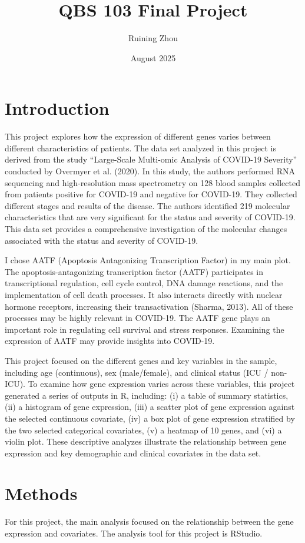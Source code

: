 \documentclass{article}
\title{QBS 103 Final Project}
\author{Ruining Zhou }
\date{August 2025}
\begin{document}
\maketitle

\section{Introduction}
This project explores how the expression of different genes varies between different characteristics of patients. The data set analyzed in this project is derived from the study “Large-Scale Multi-omic Analysis of COVID-19 Severity” conducted by Overmyer et al. (2020). In this study, the authors performed RNA sequencing and high-resolution mass spectrometry on 128 blood samples collected from patients positive for COVID-19 and negative for COVID-19. They collected different stages and results of the disease. The authors identified 219 molecular characteristics that are very significant for the status and severity of COVID-19. This data set provides a comprehensive investigation of the molecular changes associated with the status and severity of COVID-19.

I chose AATF (Apoptosis Antagonizing Transcription Factor) in my main plot. The apoptosis-antagonizing transcription factor (AATF) participates in transcriptional regulation, cell cycle control, DNA damage reactions, and the implementation of cell death processes. It also interacts directly with nuclear hormone receptors, increasing their transactivation (Sharma, 2013). All of these processes may be highly relevant in COVID-19. The AATF gene plays an important role in regulating cell survival and stress responses. Examining the expression of AATF may provide insights into COVID-19.

This project focused on the different genes and key variables in the sample, including age (continuous), sex (male/female), and clinical status (ICU / non-ICU). To examine how gene expression varies across these variables, this project generated a series of outputs in R, including: (i) a table of summary statistics, (ii) a histogram of gene expression, (iii) a scatter plot of gene expression against the selected continuous covariate, (iv) a box plot of gene expression stratified by the two selected categorical covariates, (v) a heatmap of 10 genes, and (vi) a violin plot. These descriptive analyzes illustrate the relationship between gene expression and key demographic and clinical covariates in the data set.

\section{Methods}
For this project, the main analysis focused on the relationship between the gene expression and covariates. The analysis tool for this project is RStudio.
\end{document}
